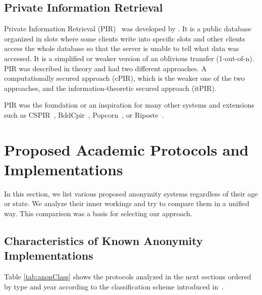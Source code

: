 \section{Private Information Retrieval}
Private Information Retrieval (PIR)~\cite{chor1995private} was developed by \citeauthor{chor1995private}. It is a  public database organized in slots where some clients write into specific slots and other clients access the whole database so that the server is unable to tell what data was accessed. It is a simplified or weaker version of an oblivious transfer (1-out-of-n). PIR was described in theory and had two different approaches. A computationally secured approach (cPIR), which is the weaker one of the two approaches, and the information-theoretic secured approach (itPIR).

PIR was the foundation or an inspiration for many other systems and extensions such as CSPIR~\cite{lipmaa2009first}, BddCpir~\cite{lipmaa2009first}, Popcorn~\cite{gupta2016scalable}, or Riposte~\cite{corrigan2015riposte}.

\chapter[Academic Protocols and Implementations]{Proposed Academic Protocols and Implementations}\label{sec:implSystems}
In this section, we list various proposed anonymity systems regardless of their age or state. We analyze their inner workings and try to compare them in a unified way. This comparison was a basis for selecting our approach.


\section{Characteristics of Known Anonymity Implementations}
Table \ref{tab:anonClass} shows the protocols analyzed in the next sections ordered by type and year according to the classification scheme introduced in~\cite{Shirazi2018}.

\gdef\cc{}
\gdef\cols{
	\ifx\cc\empty
	\gdef\cc{not empty}
	\else
	\gdef\cc{}
	\fi
	\col
}
\gdef\col{%
	\ifx\cc\empty%
	\cellcolor{black!30}%
	\else%
	\cellcolor{black!10}%
	\fi}

